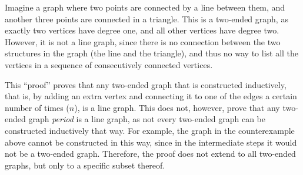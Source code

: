 
Imagine a graph where two points are connected by a line between them, and another three points are connected in a triangle. This is a two-ended graph, as exactly two vertices have degree one, and all other vertices have degree two. However, it is not a line graph, since there is no connection between the two structures in the graph (the line and the triangle), and thus no way to list all the vertices in a sequence of consecutively connected vertices.

This ``proof'' proves that any two-ended graph that is constructed inductively, that is, by adding an extra vertex and connecting it to one of the edges a certain number of times ($n$), is a line graph. This does not, however, prove that any two-ended graph \textit{period} is a line graph, as not every two-ended graph can be constructed inductively that way. For example, the graph in the counterexample above cannot be constructed in this way, since in the intermediate steps it would not be a two-ended graph. Therefore, the proof does not extend to all two-ended graphs, but only to a specific subset thereof.


